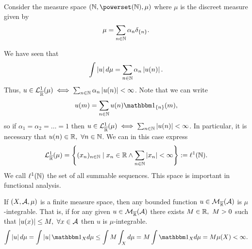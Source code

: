 \begin{eg}
	Consider the measure space $(\N, \powerset(\N), \mu)$ where $\mu$ is the discreet measure given by
	\begin{align*}
		\mu = \sum_{n\in\mathbb{N}} \alpha_n \delta_{\{n\}}.
	\end{align*}
	
	We have seen that
	\begin{align*}
		\int \left\vert{u}\right\vert d\mu = \sum_{n \in \mathbb{N}} \alpha_n \left\vert{u(n)}\right\vert.
	\end{align*}
	Thus, $u \in \mathcal{L}_{\overline{\mathbb{R}}}^1(\mu) \iff \sum_{n \in \mathbb{N}} \alpha_n \left\vert{u(n)}\right\vert < \infty$. Note that we can write
	\begin{align*}
		u(m) = \sum_{n \in \N} u(n) \ind_{\{n\}}(m),
	\end{align*}
	so if $\alpha_1 = \alpha_2 = \dots = 1$ then $u \in \mathcal{L}_{\overline{\mathbb{R}}}^1(\mu) \iff \sum_{n \in \mathbb{N}} \left\vert{u(n)}\right\vert < \infty$. In particular, it is necessary that $u(n) \in \mathbb{R},\ \forall n \in \mathbb{N}$. We can in this case express
	\begin{align*}
		\mathcal{L}^1_{\overline{\mathbb{R}}}(\mu) = \left\{ (x_n)_{n\in\mathbb{N}} \mid x_n \in \mathbb{R} \land \sum_{n\in\mathbb{N}} \left\vert{x_n}\right\vert < \infty \right\} := \ell^1(\mathbb{N}).
	\end{align*}
	We call $\ell^1(\mathbb{N})$ the set of all summable sequences. This space is important in functional analysis.
\end{eg}

\begin{eg}
	If $(X, \mathcal{A}, \mu)$ is a finite measure space, then any bounded function $u \in \mathcal{M}_{\overline{\mathbb{R}}}(\mathcal{A})$ is $\mu$-integrable. That is, if for any given $u \in \mathcal{M}_{\overline{\mathbb{R}}}(\mathcal{A})$ there exists $M \in \mathbb{R},\ M > 0$ such that $\left\vert{u(x)}\right\vert \leq M,\ \forall x \in \mathcal{A}$ then $u$ is $\mu$-integrable.
	\begin{align*}
		\int \abs{u}d\mu = \int \abs{u} \ind_X d\mu \leq \int M \int_X d\mu = M \int \ind_X d\mu = M \mu(X) < \infty.
	\end{align*}
\end{eg}